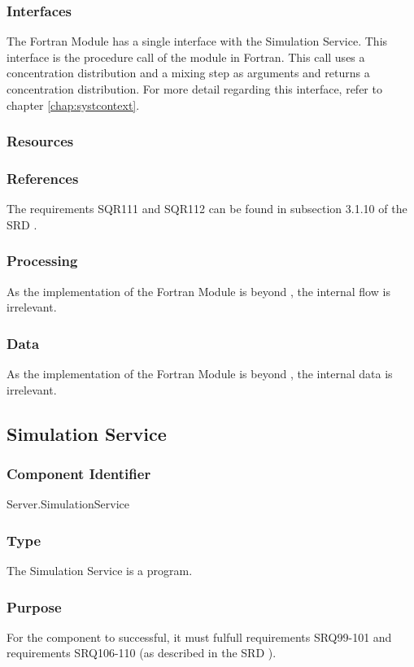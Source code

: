 \subsubsection*{Interfaces}
The Fortran Module has a single interface with the Simulation Service. This interface is the procedure call of the module in Fortran. This call uses a concentration distribution and a mixing step as arguments and returns a concentration distribution. For more detail regarding this interface, refer to  chapter \ref{chap:systcontext}.

\subsubsection*{Resources}

\subsubsection*{References}
The requirements SQR111 and SQR112 can be found in subsection 3.1.10 of the SRD \cite{srd}.

\subsubsection*{Processing}
As the implementation of the Fortran Module is beyond \projectname, the internal flow is irrelevant.

\subsubsection*{Data}
As the implementation of the Fortran Module is beyond \projectname, the internal data is irrelevant.


\subsection{Simulation Service}

\subsubsection*{Component Identifier}
Server.SimulationService

\subsubsection*{Type}
The Simulation Service is a program.

\subsubsection*{Purpose}
For the component to successful, it must fulfull requirements SRQ99-101 and requirements SRQ106-110 (as described in the SRD \cite{srd}).

